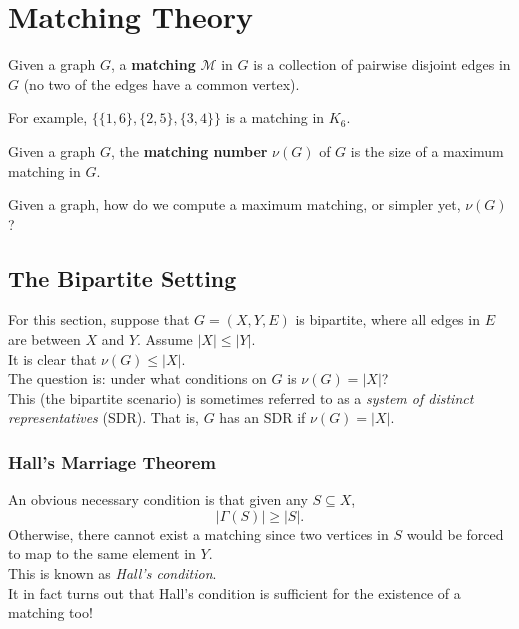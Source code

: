 \section{Matching Theory}

\begin{fdef}
	Given a graph $G$, a \textbf{matching} $\mathcal{M}$ in $G$ is a collection of pairwise disjoint edges in $G$ (no two of the edges have a common vertex).
\end{fdef}

For example, $\{\{1,6\},\{2,5\},\{3,4\}\}$ is a matching in $K_6$.

\begin{fdef}
	Given a graph $G$, the \textbf{matching number} $\nu(G)$ of $G$ is the size of a maximum matching in $G$.
\end{fdef}

Given a graph, how do we compute a maximum matching, or simpler yet, $\nu(G)$?

	\subsection{The Bipartite Setting}

		For this section, suppose that $G = (X,Y,E)$ is bipartite, where all edges in $E$ are between $X$ and $Y$. Assume $|X| \le |Y|$.\\
		It is clear that $\nu(G) \le |X|$.\\

		The question is: under what conditions on $G$ is $\nu(G) = |X|$?\\
		This (the bipartite scenario) is sometimes referred to as a \emph{system of distinct representatives} (SDR). That is, $G$ has an SDR if $\nu(G) = |X|$.\\

		\subsubsection{Hall's Marriage Theorem}

			An obvious necessary condition is that given any $S\subseteq X$,
			\[ |\Gamma(S)| \ge |S|. \]
			Otherwise, there cannot exist a matching since two vertices in $S$ would be forced to map to the same element in $Y$.\\
			This is known as \emph{Hall's condition}.\\
			It in fact turns out that Hall's condition is sufficient for the existence of a matching too!

